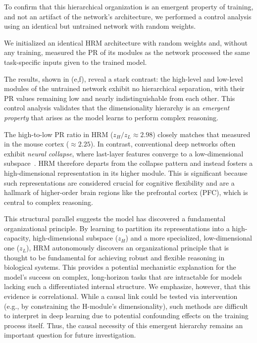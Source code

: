 To confirm that this hierarchical organization is an emergent property of training, and not an artifact of the network's architecture, we performed a control analysis using an identical but untrained network with random weights.

We initialized an identical HRM architecture with random weights and, without any training, measured the PR of its modules as the network processed the same task-specific inputs given to the trained model.

The results, shown in
(e,f), reveal a stark contrast: the high-level and
low-level modules of the untrained network exhibit no hierarchical separation, with their PR values
remaining low and nearly indistinguishable from each other. This control analysis validates that
the dimensionality hierarchy is an \emph{emergent property} that arises as the model
learns to perform complex reasoning.

The high-to-low PR ratio in HRM ($z_H/z_L \approx 2.98$) closely matches that measured in the mouse
cortex ($\approx 2.25$). In contrast, conventional deep networks often exhibit \emph{neural collapse},
where last-layer features
converge to a low-dimensional
subspace~\citep{papyan2020prevalence,fang2021layerpeeled,zhu2021geometric}.
HRM therefore departs from the collapse pattern and instead fosters a high-dimensional representation in its higher module. This is significant because such representations are considered crucial for cognitive flexibility and are a hallmark of higher-order brain regions like the prefrontal cortex (PFC), which is central to complex reasoning.

This structural parallel suggests the model has discovered a fundamental organizational principle. By learning to partition its representations into a high-capacity, high-dimensional subspace ($z_H$) and a more specialized, low-dimensional one ($z_L$), HRM autonomously discovers an organizational principle that is thought to be fundamental for achieving robust and flexible reasoning in biological systems. This provides a potential mechanistic explanation for the model's success on complex, long-horizon tasks that are intractable for models lacking such a differentiated internal structure. We emphasize, however, that this evidence is correlational. While a causal link could be tested via intervention (e.g., by constraining the H-module's dimensionality), such methods are difficult to interpret in deep learning due to potential confounding effects on the training process itself. Thus, the causal necessity of this emergent hierarchy remains an important question for future investigation.
